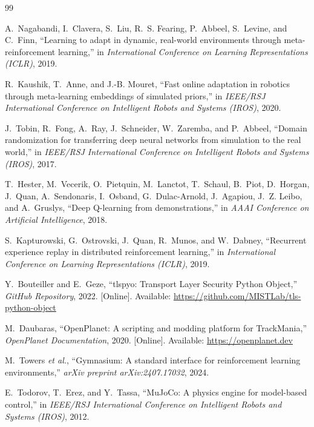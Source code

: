 \documentclass[conference]{IEEEtran}
\begin{document}
\begin{thebibliography}{99}

A.~Nagabandi, I.~Clavera, S.~Liu, R.~S. Fearing, P.~Abbeel, S.~Levine, and C.~Finn, ``Learning to adapt in dynamic, real-world environments through meta-reinforcement learning,'' in \emph{International Conference on Learning Representations (ICLR)}, 2019.




R.~Kaushik, T.~Anne, and J.-B. Mouret, ``Fast online adaptation in robotics through meta-learning embeddings of simulated priors,'' in \emph{IEEE/RSJ International Conference on Intelligent Robots and Systems (IROS)}, 2020.




J.~Tobin, R.~Fong, A.~Ray, J.~Schneider, W.~Zaremba, and P.~Abbeel, ``Domain randomization for transferring deep neural networks from simulation to the real world,'' in \emph{IEEE/RSJ International Conference on Intelligent Robots and Systems (IROS)}, 2017.




T.~Hester, M.~Vecerik, O.~Pietquin, M.~Lanctot, T.~Schaul, B.~Piot, D.~Horgan, J.~Quan, A.~Sendonaris, I.~Osband, G.~Dulac-Arnold, J.~Agapiou, J.~Z. Leibo, and A.~Gruslys, ``Deep Q-learning from demonstrations,'' in \emph{AAAI Conference on Artificial Intelligence}, 2018.




S.~Kapturowski, G.~Ostrovski, J.~Quan, R.~Munos, and W.~Dabney, ``Recurrent experience replay in distributed reinforcement learning,'' in \emph{International Conference on Learning Representations (ICLR)}, 2019.




Y.~Bouteiller and E.~Geze, ``tlspyo: Transport Layer Security Python Object,'' \emph{GitHub Repository}, 2022. [Online]. Available: \url{https://github.com/MISTLab/tls-python-object}




M.~Daubaras, ``OpenPlanet: A scripting and modding platform for TrackMania,'' \emph{OpenPlanet Documentation}, 2020. [Online]. Available: \url{https://openplanet.dev}




M.~Towers \emph{et al.}, ``Gymnasium: A standard interface for reinforcement learning environments,'' \emph{arXiv preprint arXiv:2407.17032}, 2024.




E.~Todorov, T.~Erez, and Y.~Tassa, ``MuJoCo: A physics engine for model-based control,'' in \emph{IEEE/RSJ International Conference on Intelligent Robots and Systems (IROS)}, 2012.



\end{thebibliography}

\endgroup
\end{document}

